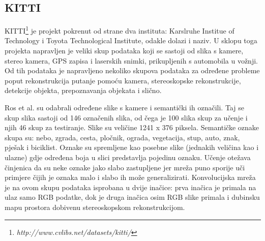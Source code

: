 \documentclass[times, utf8, diplomski, numeric]{fer}
\begin{document}
\subsection{KITTI}
KITTI\footnote{\emph{http://www.cvlibs.net/datasets/kitti/}} je projekt pokrenut od strane dva instituta: Karslruhe Institue of Technology i Toyota Technological Institute, odakle dolazi i naziv. U sklopu toga projekta napravljen je veliki skup podataka koji se sastoji od slika s kamere, stereo kamera, GPS zapisa i laserskih snimki, prikupljenih s automobila u vožnji. Od tih podataka je napravljeno nekoliko skupova
podataka za određene probleme poput rekonstrukcija putanje pomoću kamera, stereoskopske rekonstrukcije, detekcije objekta, prepoznavanja objekata i slično.

Ros et al.\cite{ros:2015} su odabrali određene slike s kamere i semantički ih označili. Taj se skup slika sastoji od 146 označenih slika, od čega je 100 slika skup za učenje i njih 46 skup za testiranje. Slike su veličine 1241 x 376 piksela.
Semantičke oznake skupa su: nebo, zgrada, cesta, pločnik, ograda, vegetacija, stup, auto, znak, pješak i biciklist. Oznake su spremljene kao posebne slike (jednakih veličina kao i ulazne) gdje određena boja u slici predstavlja pojedinu oznaku.
Učenje otežava činjenica da su neke oznake jako slabo zastupljene jer mreža puno sporije uči primjere čijih je oznaka malo i slabo ih može generalizirati.
Konvolucijska mreža je na ovom skupu podataka isprobana u dvije inačice: prva inačica je primala na ulaz samo RGB podatke, dok je druga inačica osim RGB slike primala i dubinsku mapu prostora dobivenu stereoskopskom rekonstrukcijom.

\begin{bchart}[step=5,max=40,unit=\%]
      \smallskip
      \smallskip
      \smallskip
      \smallskip
      \smallskip
      \smallskip
      \smallskip
      \smallskip
      \smallskip
      \smallskip
      \smallskip
\end{bchart}
\end{document}
